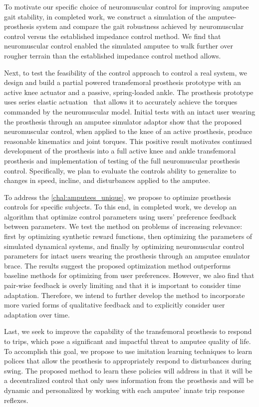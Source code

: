 To motivate our specific choice of neuromuscular control for improving amputee
gait stability, in completed work, we construct a simulation of the
amputee-prosthesis system and compare the gait robustness achieved by
neuromuscular control versus the established impedance control method. We find
that neuromuscular control enabled the simulated amputee to walk further over
rougher terrain than the established impedance control method allows.

Next, to test the feasibility of the control approach to control a real system,
we design and build a partial powered transfemoral prosthesis prototype with an
active knee actuator and a passive, spring-loaded ankle. The prosthesis
prototype uses series elastic actuation~\citep{pratt1995series} that allows it
to accurately achieve the torques commanded by the neuromuscular model. Initial
tests with an intact user wearing the prosthesis through an amputee simulator
adaptor show that the proposed neuromuscular control, when applied to the knee
of an active prosthesis, produce reasonable kinematics and joint torques. This
positive result motivates continued development of the prosthesis into a full
active knee and ankle transfemoral prosthesis and implementation of testing of
the full neuromuscular prosthesis control. Specifically, we plan to evaluate the
controls ability to generalize to changes in speed, incline, and disturbances
applied to the amputee.

To address the \cref{chal:amputees_unique}, we propose to optimize prosthesis
controls for specific subjects. To this end, in completed work, we develop an
algorithm that optimize control parameters using users' preference feedback
between parameters. We test the method on problems of increasing relevance:
first by optimizing synthetic reward functions, then optimizing the parameters
of simulated dynamical systems, and finally by optimizing neuromuscular control
parameters for intact users wearing the prosthesis through an amputee emulator
brace. The results suggest the proposed optimization method outperforms baseline
methods for optimizing from user preferences. However, we also find that
pair-wise feedback is overly limiting and that it is important to consider time
adaptation. Therefore, we intend to further develop the method to incorporate
more varied forms of qualitative feedback and to explicitly consider user
adaptation over time.

Last, we seek to improve the capability of the transfemoral prosthesis to
respond to trips, which pose a significant and impactful threat to amputee
quality of life. To accomplish this goal, we propose to use imitation learning
techniques \citep{argall2009survey} to learn polices that allow the prosthesis
to appropriately respond to disturbances during swing.  The proposed method to
learn these policies will address 
in that it will be a decentralized control that only uses information from the
prosthesis and will be dynamic and personalized by working with each amputee'
innate trip response reflexes.

